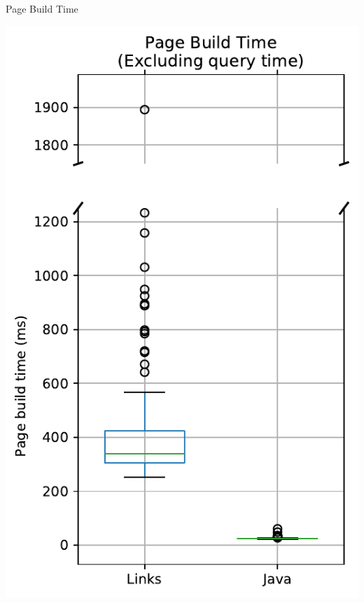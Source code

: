 \documentclass[11.5pt, aspectratio=169]{beamer}
\begin{document}
\begin{frame}{Page Build Time}

\begin{minipage}[t]{0.45\textwidth}
    \centering
    \includegraphics[scale=0.3]{images/objectdisplay_pagebuild_excl_box.pdf}
    ~

\end{minipage}
\end{frame}
\end{document}
